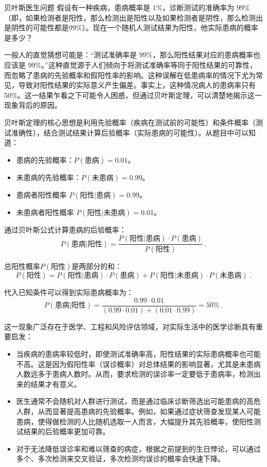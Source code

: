 \begin{example}{贝叶斯医生问题}
假设有一种疾病，患病概率是 $1\%$，诊断测试的准确率为 $99\%$（即，如果检测者是阳性，那么检测出是阳性以及如果检测者是阴性，那么检测出是阴性的可能性都是$99\%$）。现在一个随机人测试结果为阳性，他实际患病的概率是多少？
\end{example}

一般人的直觉猜想可能是：“测试准确率是 $99\%$，那么阳性结果对应的患病概率也应该是 $99\%$。”这种直觉源于人们倾向于将测试准确率等同于阳性结果的可靠性，而忽略了患病的先验概率和假阳性率的影响。这种误解在低患病率的情况下尤为常见，导致对阳性结果的实际意义产生偏差。事实上，这种情况病人的患病率只有$50\%$。这一结果乍看之下可能令人困惑，但通过贝叶斯定理，可以清楚地揭示这一现象背后的原因。

贝叶斯定理的核心思想是利用先验概率（疾病在测试前的可能性）和条件概率（测试准确性），结合测试结果计算后验概率（实际患病的可能性）。从题目中可以知道：

\begin{itemize}
\item 患病的先验概率：$P(\text{患病}) = 0.01$。
\item 未患病的先验概率：$P(\text{未患病}) = 0.99$。
\item 患病者阳性概率 $P(\text{阳性}|\text{患病}) = 0.99$。
\item 未患病者阳性概率 $P(\text{阳性}|\text{未患病}) = 0.01$。
\end{itemize}

通过贝叶斯公式计算患病的后验概率：
\begin{equation}
P(\text{患病}|\text{阳性}) = \frac{P(\text{阳性}|\text{患病}) \cdot P(\text{患病})}{P(\text{阳性})}~.
\end{equation}

总阳性概率$P(\text{阳性})$是两部分的和：
\begin{equation}
P(\text{阳性}) = P(\text{阳性}|\text{患病}) \cdot P(\text{患病}) + P(\text{阳性}|\text{未患病}) \cdot P(\text{未患病})~.
\end{equation}

代入已知条件可以得到实际患病概率为：
\begin{equation}
P(\text{患病}|\text{阳性}) = \frac{0.99 \cdot 0.01}{(0.99 \cdot 0.01) + (0.01 \cdot 0.99)}= 50\%~.
\end{equation}

这一现象广泛存在于医学、工程和风险评估领域，对实际生活中的医学诊断具有重要启发：
\begin{itemize}
\item 当疾病的患病率较低时，即使测试准确率高，阳性结果的实际患病概率也可能不高。这是因为假阳性率（误诊概率）对总体结果的影响显著，尤其是未患病人数远多于患病人数时。从而，要求检测的误诊率一定要低于患病率，检测出来的结果才有意义。
\item 医生通常不会随机对人群进行测试，而是通过临床诊断筛选出可能患病的高危人群，从而显著提高患病的先验概率。例如，如果通过症状筛查发现某人可能患病，使得做检测的人比随机选取一人而言，大幅提升其先验概率，使阳性测试结果的后验概率更加可靠。
\item 对于无法降低误诊率和难以筛查的病症，根据之前提到的生日悖论，可以通过多个、多次检测来交叉验证，多次检测均误诊的概率会快速下降。
\end{itemize}

